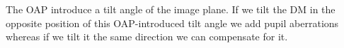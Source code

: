 \documentclass[12pt,a4paper]{article}
\begin{document}
The OAP introduce a tilt angle of the image plane. If we tilt the DM in the opposite position of this OAP-introduced tilt angle we add pupil aberrations whereas if we tilt it the same direction we can compensate for it. 


\end{document}
